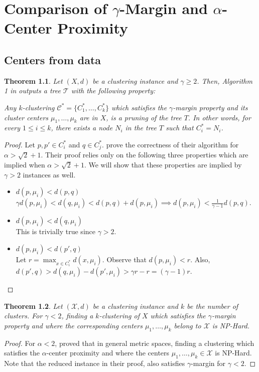 \documentclass[letterpaper,12pt,titlepage,oneside,final]{book}
\newtheorem{theorem}{Theorem}
\newcommand{\mc}{\mathcal}
\begin{document}


\appendix
\chapter{Comparison of $\gamma$-Margin and $\alpha$-Center Proximity}
\section{Centers from data}
\begin{theorem}
\label{thm:upperCenterData}
Let $(X , d)$ be a clustering instance and $\gamma \ge 2$. Then, Algorithm 1 in \cite{balcan2012clustering} outputs a tree $\mc T$ with the following property: 


Any $k$-clustering $\mc C^* = \{C_1^*, \ldots, C_k^* \}$ which satisfies the $\gamma$-margin property and its cluster centers $\mu_1, \ldots, \mu_k$ are in $X$, is a pruning of the tree $T$. In other words, for every $1 \le i \le k$, there exists a node $N_i$ in the tree $T$ such that $C_i^* = N_i$.
\end{theorem}

\begin{proof}
Let $p, p' \in C_i^*$ and $q \in C_j^*$. \cite{balcan2012clustering} prove the correctness of their algorithm for $\alpha > \sqrt{2} + 1$. Their proof relies only on the following three properties which are implied when $\alpha > \sqrt{2} + 1$. We will show that these properties are implied by $\gamma > 2$ instances as well.
\begin{itemize}
\item $d(p, \mu_i) < d(p, q)$\\
$\gamma d(p, \mu_i) < d(q, \mu_i) < d(p, q) + d(p, \mu_i) \implies d(p, \mu_i) < \frac{1}{\gamma-1}d(p, q)$.
\item $d(p, \mu_i) < d(q, \mu_i)$\\
This is trivially true since $\gamma > 2$.
\item $d(p, \mu_i) < d(p', q)$\\
Let $r = \max_{x \in C_i^*} d(x, \mu_i)$. Observe that $d(p, \mu_i) < r$. Also, $d(p', q)> d(q, \mu_i)-d(p', \mu_i) > \gamma r - r = (\gamma -1)r$.
\end{itemize}
\end{proof}

\begin{theorem}
\label{thm:lowerCenterData}
Let $(\mc X, d)$ be a clustering instance and $k$ be the number of clusters. For $\gamma < 2$, finding a $k$-clustering of $X$ which satisfies the $\gamma$-margin property and where the corresponding centers $\mu_1, \ldots, \mu_k$ belong to $\mc X$ is NP-Hard.
\end{theorem}
\begin{proof}
For $\alpha < 2$, \cite{ben2014data} proved that in general metric spaces, finding a clustering which satisfies the $\alpha$-center proximity and where the centers $\mu_1, \ldots, \mu_k \in \mc X$ is NP-Hard. Note that the reduced instance in their proof, also satisfies $\gamma$-margin for $\gamma < 2$. 
\end{proof}
\end{document}
